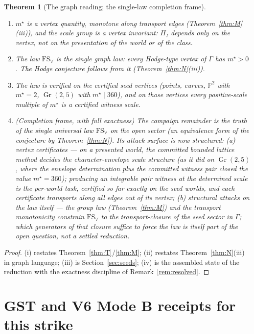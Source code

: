 \documentclass[11pt]{article}
\newtheorem{theorem}{Theorem}[section]
\newcommand{\Pp}{\mathbb{P}}
\newcommand{\Gr}{\operatorname{Gr}}
\newcommand{\FS}{\mathrm{FS}_\forall}
\begin{document}
\begin{theorem}[The graph reading; the single-law completion frame]
\label{thm:G}
\begin{enumerate}
\item[\textup{(i)}] $m^\star$ is a vertex quantity, monotone along transport
edges (Theorem~\ref{thm:M}(iii)), and the scale group is a vertex invariant:
$\Pi_I$ depends only on the vertex, not on the presentation of the world or
of the class.
\item[\textup{(ii)}] The law $\FS$ is the single graph law: every Hodge-type
vertex of $\Gamma$ has $m^\star>0$.  The Hodge conjecture follows from it
(Theorem~\ref{thm:N}(iii)).
\item[\textup{(iii)}] The law is verified on the certified seed vertices
(points, curves, $\Pp^2$ with $m^\star=2$, $\Gr(2,5)$ with $m^\star\mid360$),
and on those vertices every positive-scale multiple of $m^\star$ is a
certified witness scale.
\item[\textup{(iv)}] \emph{(Completion frame, with full exactness)} The campaign
remainder is the truth of the single universal law $\FS$ on the open sector
(an equivalence form of the conjecture by Theorem~\ref{thm:N}).  Its attack
surface is now structured: (a) vertex certificates --- on a presented world,
the committed bounded lattice method decides the \emph{character-envelope}
scale structure (as it did on $\Gr(2,5)$, where the envelope determination
plus the committed witness pair closed the value $m^\star=360$); producing
an integrable pair witness at the determined scale is the per-world task,
certified so far exactly on the seed worlds, and each certificate transports
along all edges out of its vertex; (b) structural attacks on the law itself
--- the group law (Theorem~\ref{thm:M}) and the transport monotonicity
constrain $\FS$ to the transport-closure of the seed sector in $\Gamma$;
which generators of that closure suffice to force the law is itself part of
the open question, not a settled reduction.
\end{enumerate}
\end{theorem}

\begin{proof}
(i) restates Theorem~\ref{thm:T}/\ref{thm:M}; (ii) restates
Theorem~\ref{thm:N}(iii) in graph language; (iii) is
Section~\ref{sec:seeds}; (iv) is the assembled state of the reduction with
the exactness discipline of Remark~\ref{rem:resolved}.
\end{proof}

\section{GST and V6 Mode B receipts for this strike}
\label{sec:receipts}
\end{document}
